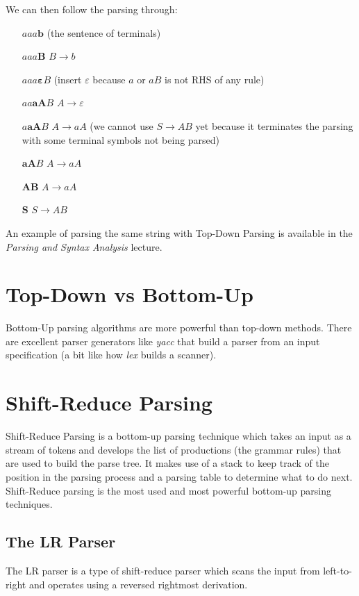 We can then follow the parsing through:
\begin{itemize}
    \setlength{\itemindent}{2em}
    \item[$aaa\boldsymbol{b}$] (the sentence of terminals)
    \item[$aaa\boldsymbol{B}$] $B \rightarrow b$
    \item[$aaa\boldsymbol{\varepsilon}B$] (insert $\varepsilon$ because $a$ or $aB$ is not RHS of any rule)
    \item[$aa\boldsymbol{aA}B$] $A \rightarrow \varepsilon$
    \item[$a\boldsymbol{aA}B$] $A \rightarrow aA$ (we cannot use $S \rightarrow AB$ yet because it terminates the parsing with some terminal symbols not being parsed)
    \item[$\boldsymbol{aA}B$] $A \rightarrow aA$
    \item[$\boldsymbol{AB}$]  $A \rightarrow aA$
    \item[$\boldsymbol{S}$] $S \rightarrow AB$
\end{itemize}
An example of parsing the same string with Top-Down Parsing is available in the \textit{Parsing and Syntax Analysis} lecture.

\section{Top-Down vs Bottom-Up}
Bottom-Up parsing algorithms are more powerful than top-down methods. There are excellent parser generators like \textit{yacc} that build a parser from an input specification (a bit like how \textit{lex} builds a scanner). 

\section{Shift-Reduce Parsing}
Shift-Reduce Parsing is a bottom-up parsing technique which takes an input as a stream of tokens and develops the list of productions (the grammar rules) that are used to build the parse tree. It makes use of a stack to keep track of the position in the parsing process and a parsing table to determine what to do next. \\

Shift-Reduce parsing is the most used and most powerful bottom-up parsing techniques.

\subsection{The LR Parser}
The LR parser is a type of shift-reduce parser which scans the input from left-to-right and operates using a reversed rightmost derivation.\\

